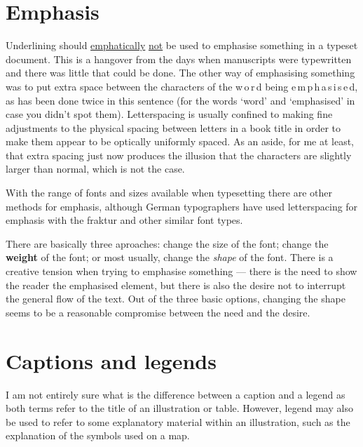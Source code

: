 \documentclass[10pt,letterpaper,extrafontsizes]{memoir}
\begin{document}
\section{Emphasis}

    Underlining should \underline{emphatically} \underline{not} be
used to emphasise something in a typeset document. This is a hangover
from the days when manuscripts were typewritten and there was little
that could be done. The other way of emphasising something was to
put extra space between the characters of the w\,o\,r\,d being
e\,m\,p\,h\,a\,s\,i\,s\,e\,d, as has been done twice in this sentence
(for the words `word' and `emphasised' in case you didn't spot them).
Letterspacing is usually confined to making fine adjustments to the 
physical spacing between letters in a book
title in order to make them appear to be optically uniformly spaced. 
As an aside, for me at least, that extra spacing just now produces the 
illusion that the
characters are slightly larger than normal, which is not the case.

    With the range of fonts and sizes available when typesetting there
are other methods for emphasis, although German typographers have used
letterspacing for emphasis with the fraktur and other similar font types.

    There are basically three aproaches: 
change the {\Large size} of the font;
change the \textbf{weight} of the font; or most usually, change the
\emph{shape} of the font. There is a creative tension when trying
to emphasise something --- there is the need to show the reader the 
emphasised
element, but there is also the desire not to interrupt the general flow
of the text. Out of the three basic options, changing the shape seems
to be a reasonable compromise between the need and the desire.

\section{Captions and legends}


    I am not entirely sure what is the difference between a
caption and a legend as both terms refer to the title of an 
illustration or table. 
However, legend may also be used to refer to some explanatory 
material within an illustration, such as the 
explanation of the symbols used on a map.
\end{document}
